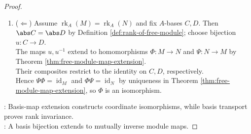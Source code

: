 \begin{proposition}
\begin{proof}
\begin{enumerate}[label=(\roman*)]
If $F\subseteq C$ is finite and $(a_c)_{c\in F}\in A^F$ satisfies $\sum\limits_{c\in F}a_c\psi(c)=0_N$, then $\sum\limits_{c\in F}a_cc=0_M$ by injectivity.\\
Thus $(\forall c\in F)\ a_c=0_A$ by independence of $C$. Set $\psi(C)$ is $A$-basis of $N$ by preceding spanning, independence.\\
Since $\psi|_C:C\to\psi(C)$ is a bijection, $\operatorname{rk}_A(M)=\abs C=\abs{\psi(C)}=\operatorname{rk}_A(N)$.
\item[$(ii)$] ($\Leftarrow$) Assume $\operatorname{rk}_A(M)=\operatorname{rk}_A(N)$ and fix $A$-bases $C,D$. Then $\abs C=\abs D$ by Definition \ref{def:rank-of-free-module}; choose bijection $u:C\to D$.\\
The maps $u,u^{-1}$ extend to homomorphisms $\Phi:M\to N$ and $\Psi:N\to M$ by Theorem \ref{thm:free-module-map-extension}.\\
Their composites restrict to the identity on $C,D$, respectively.\\
Hence $\Psi\Phi=\operatorname{id}_M$ and $\Phi\Psi=\operatorname{id}_N$ by uniqueness in Theorem \ref{thm:free-module-map-extension}, so $\Phi$ is an isomorphism.
\end{enumerate}
: Basis-map extension constructs coordinate isomorphisms, while basis transport proves rank invariance.\\
: A basis bijection extends to mutually inverse module maps.
\end{proof}
\end{proposition}

